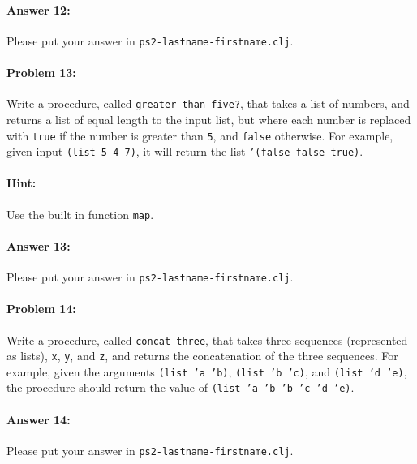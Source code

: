 \documentclass[10pt]{article}
\newcommand{\PSnum}{2}
\begin{document}
\paragraph{Answer 12:} Please put your answer in \texttt{ps\PSnum-lastname-firstname.clj}.

\noindent\hrulefill %

\paragraph{Problem 13:}
  Write a procedure, called \texttt{greater-than-five?}, that takes a
  list of numbers, and returns a list of equal length to the input list,
  but where each number is replaced with \texttt{true} if the
  number is greater than \texttt{5}, and \texttt{false} otherwise. For
  example, given input \texttt{(list 5 4 7)}, it will return the list
  \texttt{'(false false true)}. 

\paragraph{Hint:}
  Use the built in function \texttt{map}.

\paragraph{Answer 13:} Please put your answer in \texttt{ps\PSnum-lastname-firstname.clj}.

\noindent\hrulefill %

\paragraph{Problem 14:}
Write a procedure, called \texttt{concat-three}, that takes three
sequences (represented as lists), \texttt{x}, \texttt{y}, and
\texttt{z}, and returns the concatenation of the three sequences. For
example, given the arguments \texttt{(list 'a 'b)}, \texttt{(list 'b
  'c)}, and \texttt{(list 'd 'e)}, the procedure should return the value of
\texttt{(list 'a 'b 'b 'c 'd 'e)}.

\paragraph{Answer 14:} Please put your answer in \texttt{ps\PSnum-lastname-firstname.clj}.

\noindent\hrulefill %
\end{document}
